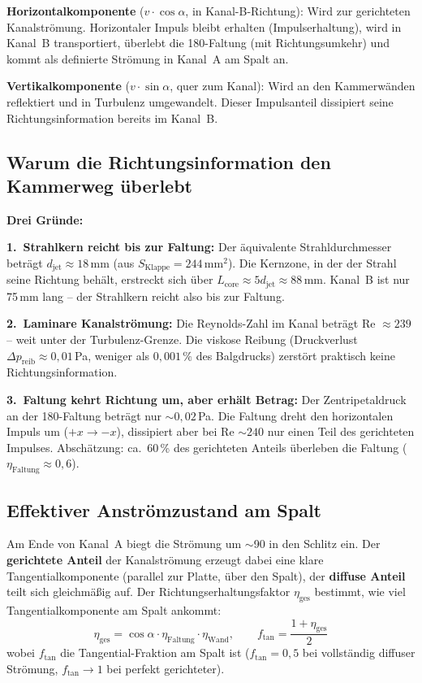 \documentclass[11pt,a4paper]{article}
\begin{document}
\textbf{Horizontalkomponente} ($v \cdot \cos\alpha$, in Kanal-B-Richtung): Wird zur gerichteten Kanalströmung. Horizontaler Impuls bleibt erhalten (Impulserhaltung), wird in Kanal~B transportiert, überlebt die 180\textdegree-Faltung (mit Richtungsumkehr) und kommt als definierte Strömung in Kanal~A am Spalt an.

\textbf{Vertikalkomponente} ($v \cdot \sin\alpha$, quer zum Kanal): Wird an den Kammerwänden reflektiert und in Turbulenz umgewandelt. Dieser Impulsanteil dissipiert seine Richtungsinformation bereits im Kanal~B.

\subsection{Warum die Richtungsinformation den Kammerweg überlebt}

\textbf{Drei Gründe:}

\textbf{1.\ Strahlkern reicht bis zur Faltung:} Der äquivalente Strahldurchmesser beträgt $d_\text{jet} \approx 18$\,mm (aus $S_\text{Klappe} = 244$\,mm$^2$). Die Kernzone, in der der Strahl seine Richtung behält, erstreckt sich über $L_\text{core} \approx 5 d_\text{jet} \approx 88$\,mm. Kanal~B ist nur 75\,mm lang -- der Strahlkern reicht also bis zur Faltung.

\textbf{2.\ Laminare Kanalströmung:} Die Reynolds-Zahl im Kanal beträgt Re $\approx 239$ -- weit unter der Turbulenz-Grenze. Die viskose Reibung (Druckverlust $\Delta p_\text{reib} \approx 0{,}01$\,Pa, weniger als $0{,}001\,\%$ des Balgdrucks) zerstört praktisch keine Richtungsinformation.

\textbf{3.\ Faltung kehrt Richtung um, aber erhält Betrag:} Der Zentripetaldruck an der 180\textdegree-Faltung beträgt nur $\sim 0{,}02$\,Pa. Die Faltung dreht den horizontalen Impuls um ($+x \rightarrow -x$), dissipiert aber bei Re $\sim 240$ nur einen Teil des gerichteten Impulses. Abschätzung: ca.\ 60\,\% des gerichteten Anteils überleben die Faltung ($\eta_\text{Faltung} \approx 0{,}6$).

\subsection{Effektiver Anströmzustand am Spalt}

Am Ende von Kanal~A biegt die Strömung um $\sim$90\textdegree{} in den Schlitz ein. Der \textbf{gerichtete Anteil} der Kanalströmung erzeugt dabei eine klare Tangentialkomponente (parallel zur Platte, über den Spalt), der \textbf{diffuse Anteil} teilt sich gleichmäßig auf. Der Richtungserhaltungsfaktor $\eta_\text{ges}$ bestimmt, wie viel Tangentialkomponente am Spalt ankommt:
\begin{equation}
\eta_\text{ges} = \cos\alpha \cdot \eta_\text{Faltung} \cdot \eta_\text{Wand}, \qquad
f_\text{tan} = \frac{1 + \eta_\text{ges}}{2}
\end{equation}
wobei $f_\text{tan}$ die Tangential-Fraktion am Spalt ist ($f_\text{tan} = 0{,}5$ bei vollständig diffuser Strömung, $f_\text{tan} \to 1$ bei perfekt gerichteter).
\end{document}
